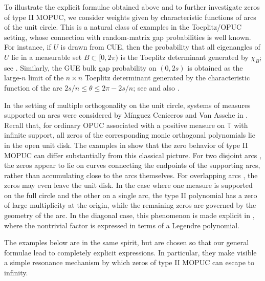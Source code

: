 \documentclass[a4paper,10pt,leqno]{amsart}
\numberwithin{equation}{section}
\theoremstyle{remark}
\begin{document}
To illustrate the explicit formulae obtained above and to further investigate
zeros of type II MOPUC, we consider weights given by characteristic functions
of arcs of the unit circle.  This is a natural class of examples in the
Toeplitz/OPUC setting, whose connection with random-matrix gap probabilities
is well known.  For instance, if \(U\) is drawn from CUE, then the probability
that all eigenangles of \(U\) lie in a measurable set \(B\subset[0,2\pi)\) is
the Toeplitz determinant generated by \(\chi_B\); see
\cite{Mehta04,CharlierClaeys15}.  Similarly, the GUE bulk gap probability on
\((0,2s)\) is obtained as the large-\(n\) limit of the \(n\times n\) Toeplitz
determinant generated by the characteristic function of the arc
\(2s/n\leq \theta\leq 2\pi-2s/n\); see \cite{Krasovsky04}
and also \cite{Marchal20}.

In the setting of multiple orthogonality on the unit circle, systems of
measures supported on arcs were considered by M\'inguez Ceniceros and
Van Assche in \cite{MCVA08}.  Recall that, for ordinary OPUC associated
with a positive measure on \(\mathbb T\) with infinite support, all zeros of
the corresponding monic orthogonal polynomials lie in the open unit disk.
The examples in \cite{MCVA08} show that the zero behavior of type II MOPUC
can differ substantially from this classical picture.  For two disjoint arcs
\cite[Example~1]{MCVA08}, the zeros appear to lie on curves connecting the
endpoints of the supporting arcs, rather than accumulating close to the arcs
themselves.  For overlapping arcs \cite[Example~2]{MCVA08}, the zeros may
even leave the unit disk.  In the case where one measure is supported on the
full circle and the other on a single arc, the type II polynomial has a zero
of large multiplicity at the origin, while the remaining zeros are governed
by the geometry of the arc.  In the diagonal case, this phenomenon is made
explicit in \cite[Proposition~3.1]{MCVA08}, where the nontrivial factor is
expressed in terms of a Legendre polynomial.



The examples below are in the same spirit, but are chosen so that our general formulae lead to completely explicit expressions.  In
particular, they make visible a simple resonance mechanism by which zeros
of type II MOPUC can escape to infinity.
\end{document}
